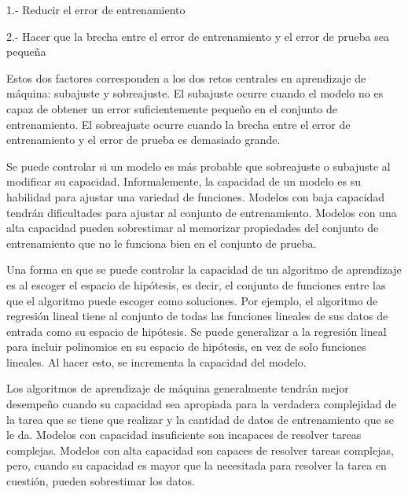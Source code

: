 1.- Reducir el error de entrenamiento

2.- Hacer que la brecha entre el error de entrenamiento y el error de prueba sea pequeña

\vspace{1em}

Estos dos factores corresponden a los dos retos centrales en aprendizaje de máquina: subajuste y sobreajuste. El subajuste ocurre cuando el modelo no es capaz de obtener un error suficientemente pequeño en el conjunto de entrenamiento. El sobreajuste ocurre cuando la brecha entre el error de entrenamiento y el error de prueba es demasiado grande.

\vspace{1em}

Se puede controlar si un modelo es más probable que sobreajuste o subajuste al modificar su capacidad. Informalemente, la capacidad de un modelo es su habilidad para ajustar una variedad de funciones. Modelos con baja capacidad tendrán dificultades para ajustar al conjunto de entrenamiento. Modelos con una alta capacidad pueden sobrestimar al memorizar propiedades del conjunto de entrenamiento que no le funciona bien en el conjunto de prueba.
\cite{goodfellow-et-al-2016}

\vspace{1em}

Una forma en que se puede controlar la capacidad de un algoritmo de aprendizaje es al escoger el espacio de hipótesis, es decir, el conjunto de funciones entre las que el algoritmo puede escoger como soluciones. Por ejemplo, el algoritmo de regresión lineal tiene al conjunto de todas las funciones lineales de sus datos de entrada como su espacio de hipótesis. Se puede generalizar a la regresión lineal para incluir polinomios en su espacio de hipótesis, en vez de solo funciones lineales. Al hacer esto, se incrementa la capacidad del modelo.

\vspace{1em}

Los algoritmos de aprendizaje de máquina generalmente tendrán mejor desempeño cuando su capacidad sea apropiada para la verdadera complejidad de la tarea que se tiene que realizar y la cantidad de datos de entrenamiento que se le da. Modelos con capacidad insuficiente son incapaces de resolver tareas complejas. Modelos con alta capacidad son capaces de resolver tareas complejas, pero, cuando su capacidad es mayor que la necesitada para resolver la tarea en cuestión, pueden sobrestimar los datos.

